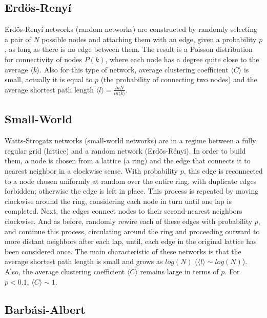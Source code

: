 \documentclass[11pt]{article}
\begin{document}
\subsection{Erd\"{o}s-Reny\'i}

Erd\"{o}s-Reny\'i networks \cite{Erdos1959} (random networks) are constructed by randomly selecting a pair of $N$ possible nodes and attaching them with an edge, given a probability $p$, as long as there is no edge between them. The result is a Poisson distribution for connectivity of nodes $P(k)$, where each node has a degree quite close to the average $\langle k \rangle$. Also for this type of network, average clustering coefficient  $\langle C \rangle$ is small, actually it is equal to $p$ (the probability of connecting two nodes) and the average shortest path length $\langle l \rangle = \frac{lnN}{ln\langle k \rangle}$.


\subsection{Small-World}

Watts-Strogatz networks \cite{Watts1998} (small-world networks) are in a regime between a fully regular grid (lattice) and a random network (Erd\"{o}s-R\'enyi). In order to build them, a node is chosen from a lattice (a ring) and the edge that connects it to nearest neighbor in a clockwise sense. With probability $p$, this edge is reconnected to a node chosen uniformly at random over the entire ring, with duplicate edges forbidden; otherwise the edge is left in place. This process is repeated by moving clockwise around the ring, considering each node in turn until one lap is completed. Next, the edges connect nodes to their second-nearest neighbors clockwise. And as before, randomly rewire each of these edges with probability $p$, and continue this process, circulating around the ring and proceeding outward to more distant neighbors after each lap, until, each edge in the original lattice has been considered once. The main characteristic of these networks is that the average shortest path length is small and grows as $log(N)$ ($\langle l \rangle \sim log(N)$). Also, the average clustering coefficient $\langle C \rangle$ remains large in terms of $p$. For $p < 0.1$, $\langle C \rangle \sim 1$.

\subsection{Barb\'asi-Albert}
\end{document}
